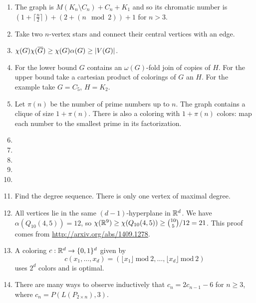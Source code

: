 \begin{enumerate}

\item The graph is $M(K_n\setminus C_n) + C_n + K_1$ and so its chromatic number is $(1+\lceil\frac{n}{2}\rceil) + (2+(n \mod 2)) + 1$ for $n>3$.

\item Take two $n$-vertex stars and connect their central vertices with an edge.

\item $\chi(G)\chi(\overline{G})\geq \chi(G)\alpha(G)\geq |V(G)|$.

\item For the lower bound $G$ contains an $\omega(G)$-fold join of copies of $H$. For the upper bound take a cartesian product of colorings of $G$ an $H$. For the example take $G=C_5$, $H=K_2$.

\item Let $\pi(n)$ be the number of prime numbers up to $n$. The graph contains a clique of size $1+\pi(n)$. There is also a coloring with $1+\pi(n)$ colors: map each number to the smallest prime in its factorization.

\item 

\item

\item

\item

\item

\item Find the degree sequence. There is only one vertex of maximal degree.

\item All vertices lie in the same $(d-1)$-hyperplane in $\mathbb{R}^d$. We have $\alpha(Q_{10}(4,5))=12$, so $\chi(\mathbb{R}^9)\geq \chi(Q_{10}(4,5))\geq {10 \choose 5}/12 = 21$. This proof comes from \url{http://arxiv.org/abs/1409.1278}.

\item A coloring $c:\mathbb{R}^d\to\{0,1\}^d$ given by
$$c(x_1,\ldots,x_d)=(\lfloor x_1\rfloor \ \textrm{mod}\ 2,\ldots, \lfloor x_d\rfloor \ \textrm{mod}\ 2 )$$
uses $2^d$ colors and is optimal.

\item There are many ways to observe inductively that $c_n=2c_{n-1}-6$ for $n\geq 3$, where $c_n=P(L(P_{2\times n}), 3)$.


\end{enumerate}
